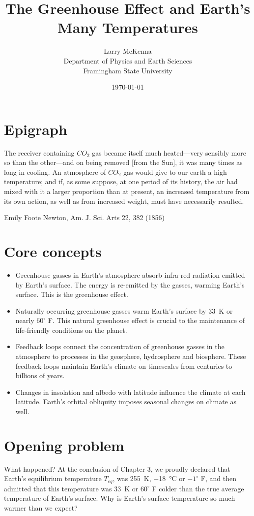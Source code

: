 \documentclass[amstex,12pt]{book}
\begin{document}
\title{The Greenhouse Effect and Earth's Many Temperatures}\label{The Greenhouse Effect}
\date{\today}
\author{Larry McKenna\\Department of Physics and Earth Sciences\\Framingham State University}
\maketitle
\section{Epigraph} \label{Epigraph}
\epigraph{The receiver containing $CO_2$ gas became itself much heated—very sensibly more so than the other—and on being removed [from the Sun], it was many times as long in cooling. An atmosphere of $CO_2$ gas would give to our earth a high temperature; and if, as some suppose, at one period of its history, the air had mixed with it a larger proportion than at present, an increased temperature from its own action, as well as from increased weight, must have necessarily resulted.}{Emily Foote Newton, Am. J. Sci. Arts 22, 382 (1856)} 


\section{Core concepts} \label{Core Concepts}
\begin{itemize}
\item Greenhouse gasses in Earth's atmosphere absorb infra-red radiation emitted by Earth's surface. The energy is re-emitted by the gasses, warming Earth's surface. This is the greenhouse effect.
\item Naturally occurring greenhouse gasses warm Earth's surface by \SI{33}{\kelvin} or nearly ${60}^{\circ}$ F. This natural greenhouse effect is crucial to the maintenance of life-friendly conditions on the planet.
\item Feedback loops connect the concentration of greenhouse gasses in the atmosphere to processes in the geosphere, hydrosphere and biosphere. These feedback loops maintain Earth's climate on timescales from centuries to billions of years.
\item Changes in insolation and albedo with latitude influence the climate at each latitude. Earth's orbital obliquity imposes seasonal changes on climate as well. 
\end{itemize}

\section{Opening problem} \label{Earth's many temperatures}
What happened? At the conclusion of Chapter 3, we proudly declared that Earth's equilibrium temperature $T_{eq}$, was \SI{255}{\kelvin}, \SI{-18}{\celsius} or ${-1}^{\circ}$ F, and then admitted that this temperature was \SI{33}{\kelvin} or ${60}^{\circ}$ F colder than the true average temperature of Earth's surface. Why is Earth's surface temperature so much warmer than we expect?
\end{document}
